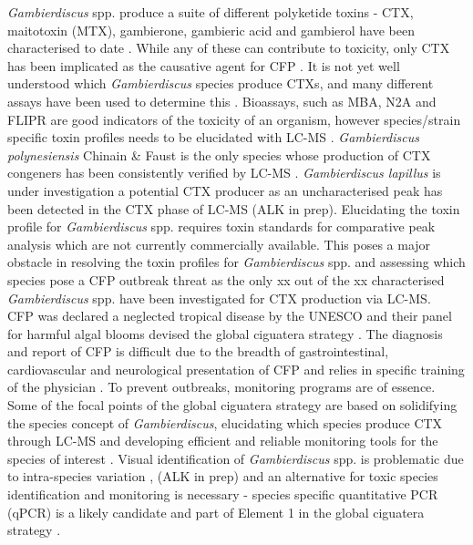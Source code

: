 \documentclass[12pt]{article}
\begin{document}
\emph{Gambierdiscus} spp. produce a suite of different polyketide toxins - CTX, maitotoxin (MTX), gambierone, gambieric acid and gambierol have been characterised to date \citep{satake1993gambierol,nagai1992gambieric,rodriguez2015gambierone,murata1993structure,murata1989structures}. While any of these can contribute to toxicity, only CTX has been implicated as the causative agent for CFP \citep{chinain1997intraspecific,holmes1998gambierdiscus}. It is not yet well understood which \textit{Gambierdiscus} species produce CTXs, and many different assays have been used to determine this \citep{globalcig}. Bioassays, such as MBA, N2A and FLIPR are good indicators of the toxicity of an organism, however species/strain specific toxin profiles needs to be elucidated with LC-MS \citep{diogened2014chemistry}. \textit{Gambierdiscus polynesiensis} Chinain \& Faust is the only species whose production of CTX congeners has been consistently verified by LC-MS \citep{chinain2010growth}. \emph{Gambierdiscus lapillus} is under investigation a potential CTX producer as an uncharacterised peak has been detected in the CTX phase of LC-MS (ALK in prep). Elucidating the toxin profile for \textit{Gambierdiscus} spp. requires toxin standards for comparative peak analysis which are not currently commercially available. This poses a major obstacle in resolving the toxin profiles for \textit{Gambierdiscus} spp. and assessing which species pose a CFP outbreak threat as the only xx out of the xx characterised \textit{Gambierdiscus} spp. have been investigated for CTX production via LC-MS. \\

CFP was declared a neglected tropical disease by the UNESCO and their panel for harmful algal blooms devised the global ciguatera strategy \citep{globalcig}.
The diagnosis and report of CFP is difficult due to the breadth of gastrointestinal, cardiovascular and neurological presentation of CFP and relies in specific training of the physician \citep{sims1987theoretical}. 
To prevent outbreaks, monitoring programs are of essence. Some of the focal points of the global ciguatera strategy are based on solidifying the species concept of \emph{Gambierdiscus}, elucidating which species produce CTX through LC-MS and developing efficient and reliable monitoring tools for the species of interest \citep{globalcig}. Visual identification of \emph{Gambierdiscus} spp. is problematic due to intra-species variation \citep{kohli2014high,bravo2014cellular}, (ALK in prep) and an alternative for toxic species identification and monitoring is necessary - species specific quantitative PCR (qPCR) is a likely candidate and part of Element 1 in the global ciguatera strategy \citep{globalcig}. \\
\end{document}
